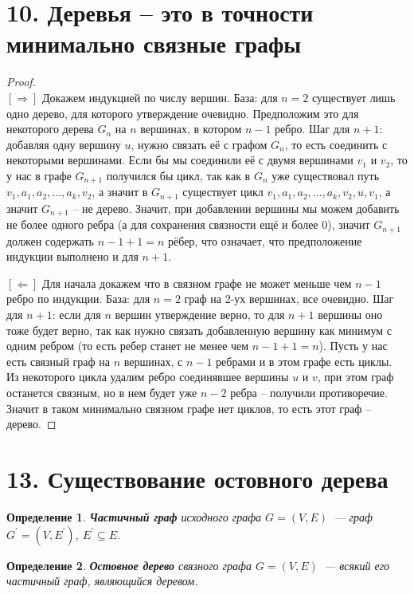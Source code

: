 \documentclass[a4paper,12pt]{article}
\newtheorem*{defin}{Определение}
\begin{document}
    \section*{10. Деревья -- это в точности минимально связные графы}
    \begin{proof}\ \\
        $[\Rightarrow]$ Докажем индукцией по числу вершин. База: для $n = 2$ существует лишь одно дерево, для которого утверждение очевидно. Предположим это для некоторого дерева $G_{n}$ на $n$ вершинах, в котором $n - 1$ ребро. Шаг для $n + 1$: добавляя одну вершину $u$, нужно связать её с графом $G_{n}$, то есть соединить с некоторыми вершинами. Если бы мы соединили её с двумя вершинами $v_{1}$ и $v_{2}$, то у нас в графе $G_{n+1}$ получился бы цикл, так как в $G_{n}$ уже существовал путь $v_{1}, a_{1}, a_{2},\ldots, a_{k}, v_{2}$, а значит в $G_{n+1}$ существует цикл $v_{1}, a_{1}, a_{2},\ldots, a_{k}, v_{2}, u, v_{1}$, а значит $G_{n+1}$ -- не дерево. Значит, при добавлении вершины мы можем добавить не более одного ребра (а для сохранения связности ещё и более 0), значит $G_{n+1}$ должен содержать $n - 1 + 1 = n$ рёбер, что означает, что предположение индукции выполнено и для $n + 1$.
        
        \noindent$[\Leftarrow]$ Для начала докажем что в связном графе не может меньше чем $n - 1$ ребро по индукции. База: для $n = 2$ граф на 2-ух вершинах, все очевидно. Шаг для $n + 1$: если для $n$ вершин утверждение верно, то для $n + 1$ вершины оно тоже будет верно, так как нужно связать добавленную вершину как минимум с одним ребром (то есть ребер станет не менее чем $n - 1 + 1 = n$). Пусть у нас есть связный граф на $n$ вершинах, с $n - 1$ ребрами и в этом графе есть циклы. Из некоторого цикла удалим ребро соединявшее вершины $u$ и $v$, при этом граф останется связным, но в нем будет уже $n - 2$ ребра -- получили противоречие. Значит в таком минимально связном графе нет циклов, то есть этот граф -- дерево.
    \end{proof}
    \pagebreak %
 	\section*{13. Существование остовного дерева}
 	\begin{defin} \textbf{Частичный граф} исходного графа 
 		$G = (V, E)$ — граф $G^{\prime} = (V, E^{\prime})$, $E^{\prime} \subseteq E$.
	\end{defin}

	\begin{defin} \textbf{Остовное дерево} связного графа $G = (V, E)$ — всякий его частичный граф, являющийся деревом.
	\end{defin}
\end{document}

